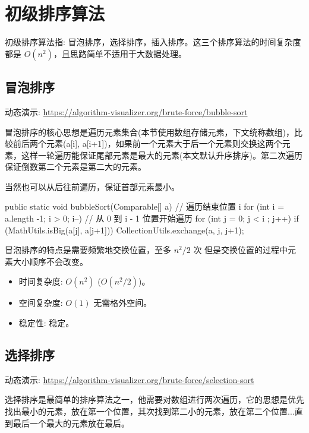 \section{初级排序算法}

初级排序算法指: 冒泡排序，选择排序，插入排序。这三个排序算法的时间复杂度都是 $O(n^2)$，且思路简单不适用于大数据处理。

\subsection{冒泡排序}

动态演示: \url{https://algorithm-visualizer.org/brute-force/bubble-sort}

冒泡排序的核心思想是遍历元素集合(本节使用数组存储元素，下文统称数组)，比较前后两个元素(a[i], a[i+1])，如果前一个元素大于后一个元素则交换这两个元素，这样一轮遍历能保证尾部元素是最大的元素(本文默认升序排序)。第二次遍历保证倒数第二个元素是第二大的元素。

当然也可以从后往前遍历，保证首部元素最小。

\begin{Java}
public static void bubbleSort(Comparable[] a) {
    // 遍历结束位置 i
    for (int i = a.length -1; i > 0; i--) {
        // 从 0 到 i - 1 位置开始遍历
        for (int j = 0; j < i ; j++) {
            if (MathUtils.isBig(a[j], a[j+1]))
                CollectionUtils.exchange(a, j, j+1);
        }
    }
}
\end{Java}

冒泡排序的特点是需要频繁地交换位置，至多 $n^2/2$ 次 但是交换位置的过程中元素大小顺序不会改变。

\begin{itemize}
  \item 时间复杂度: $O(n^2)$ ($O(n^2/2)$)。
  \item 空间复杂度: $O(1)$ 无需格外空间。
  \item 稳定性: 稳定。
\end{itemize}

\subsection{选择排序}

动态演示: \url{https://algorithm-visualizer.org/brute-force/selection-sort}

选择排序是最简单的排序算法之一，他需要对数组进行两次遍历，它的思想是优先找出最小的元素，放在第一个位置，其次找到第二小的元素，放在第二个位置...直到最后一个最大的元素放在最后。

